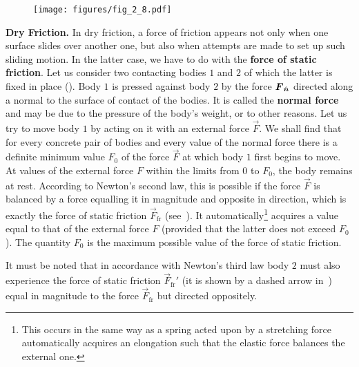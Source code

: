 \begin{figure}[t]
	\begin{center}
		\texttt{[image: figures/fig\_2\_8.pdf]}
		\caption[]{}
		\label{fig:2_8}
	\end{center}
	\vspace{-0.7cm}
\end{figure}

\textbf{Dry Friction.} In dry friction, a force of friction appears not only when one surface slides over another one, but also when attempts are made to set up such sliding motion. In the latter case, we have to do with the \textbf{force of static friction}. Let us consider two contacting bodies $1$ and $2$ of which the latter is fixed in place (). Body $1$ is pressed against body $2$ by the force $\boldsymbol{F}_{\hat{\boldsymbol{n}}}$ directed along a normal to the surface of contact of the bodies. It is called the \textbf{normal force} and may be due to the pressure of the body's weight, or to other reasons. Let us try to move body $1$ by acting on it with an external force $\vec{F}$. We shall find that for every concrete pair of bodies and every value of the normal force there is a definite minimum value $F_0$ of the force $\vec{F}$ at which body $1$ first begins to move. At values of the external force $F$ within the limits from $0$ to $F_0$, the body remains at rest. According to Newton's second law, this is possible if the force $\vec{F}$ is balanced by a force equalling it in magnitude and opposite in direction, which is exactly the force of static friction $\vec{F}_{\text{fr}}$ (see~). It automatically\footnote{This occurs in the same way as a spring acted upon by a stretching force automatically acquires an elongation such that the elastic force balances the external one.} acquires a value equal to that of the external force $F$ (provided that the latter does not exceed $F_0$). The quantity $F_0$ is the maximum possible value of the force of static friction.

It must be noted that in accordance with Newton's third law body $2$ must also experience the force of static friction $\vec{F}_{\text{fr}}'$ (it is shown by a dashed arrow in~) equal in magnitude to the force $\vec{F}_{\text{fr}}$ but directed oppositely.

